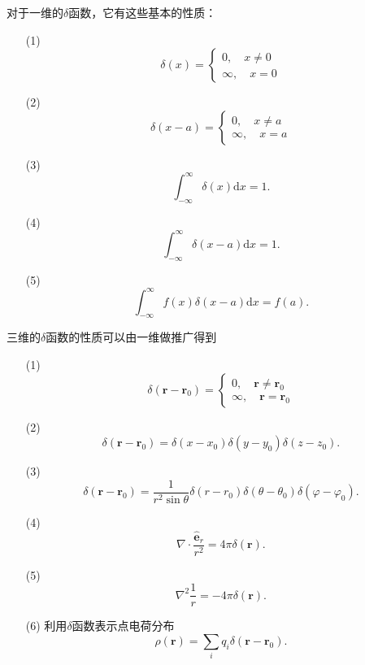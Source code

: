 \documentclass[UTF8]{ctexbook}
\renewcommand{\d}{\mathrm{d}}
\renewcommand{\b}{\boldsymbol}
\numberwithin{equation}{chapter}
\begin{document}
	对于一维的$\delta$函数，它有这些基本的性质：
	\begin{itemize}
		\item[(1)]
		\[\delta(x)=\left\{
		\begin{gathered} 0,\quad x\neq0 \\ \infty,\quad x=0 \end{gathered}\right.\] 
		\item[(2)]
		\[\delta(x-a)=\left\{
		\begin{gathered} 0,\quad x\neq a \\ \infty,\quad x=a \end{gathered}\right.\]
		\item[(3)]
		\[\int_{-\infty}^{\infty}\delta(x)\d x=1.\]
		\item[(4)]
		\[\int_{-\infty}^\infty\delta(x-a)\d x=1.\]
		\item[(5)]
		\[\int_{-\infty}^\infty f(x)\delta(x-a)\d x=f(a).\] 
	\end{itemize}

	三维的$\delta$函数的性质可以由一维做推广得到
	\begin{itemize}
		\item[(1)]
		\[\delta(\b{r}-\b{r}_0)=\left\{\begin{gathered} 0, \quad \b{r}\neq \b{r}_0 \\ \infty,\quad \b{r}=\b{r}_0 \end{gathered}\right.\]
		\item[(2)]
		\[\delta(\b{r}-\b{r}_0)=\delta(x-x_0)\delta(y-y_0)\delta(z-z_0).\]
		\item[(3)]
		\[\delta(\b{r}-\b{r}_0)=\frac{1}{r^2\sin\theta}\delta(r-r_0)\delta(\theta-\theta_0)\delta(\varphi-\varphi_0).\]
		\item[(4)]
		 \[\nabla\cdot\frac{\hat{\b{e}}_r}{r^2}=4\pi\delta(\b{r}).\]
		\item[(5)]
		\[\nabla^2\frac{1}{r}=-4\pi\delta(\b{r}).\]
		\item[(6)]
		利用$\delta$函数表示点电荷分布
		\[\rho(\b{r})=\sum_{i}q_i\delta(\b{r}-\b{r}_0).\]		 
	\end{itemize}
	
\end{document}
